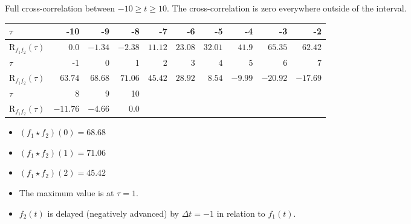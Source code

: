 \begin{solution}
	\begin{tasks}
		\task
		Full cross-correlation between $-10 \geq t \geq 10$. The cross-correlation is zero everywhere outside of the interval.
		\begin{table}[H]
			\centering
			\begin{tabular}{|l|r|r|r|r|r|r|r|r|r|}
				\hline
				$\tau$ & -10 & -9 & -8 & -7 & -6 & -5 & -4 & -3 & -2 \\
				\hline
				$\mathrm{R}_{f_1 f_2}(\tau)$ & $0.0$ & $-1.34$ & $-2.38$ & $11.12$ & $23.08$ & $32.01$ & $41.9$ & $65.35$ & $62.42$ \\
				\hline
				\hline
				$\tau$ & -1 & 0 & 1 & 2 & 3 & 4 & 5 & 6 & 7 \\
				\hline
				$\mathrm{R}_{f_1 f_2}(\tau)$ & $63.74$ & $68.68$ & $71.06$ & $45.42$ & $28.92$ & $8.54$ & $-9.99$ & $-20.92$ & $-17.69$ \\
				\hline
				\hline
				$\tau$ & 8 & 9 & 10 & & & & & & \\
				\hline
				$\mathrm{R}_{f_1 f_2}(\tau)$ & $-11.76$ & $-4.66$ & $0.0$ & & & & & & \\
				\hline
			\end{tabular}
		\end{table}
		\begin{itemize}
			\item $\left(f_1 \star f_2\right)(0) = 68.68$
			\item $\left(f_1 \star f_2\right)(1) = 71.06$
			\item $\left(f_1 \star f_2\right)(2) = 45.42$
		\end{itemize}
	
		\task
		\begin{itemize}
			\item The maximum value is at $\tau = 1$.
			\item $f_2(t)$ is delayed (negatively advanced) by $\Delta t = -1$ in relation to $f_1(t)$.
		\end{itemize}
	

\end{tasks}
\end{solution}
